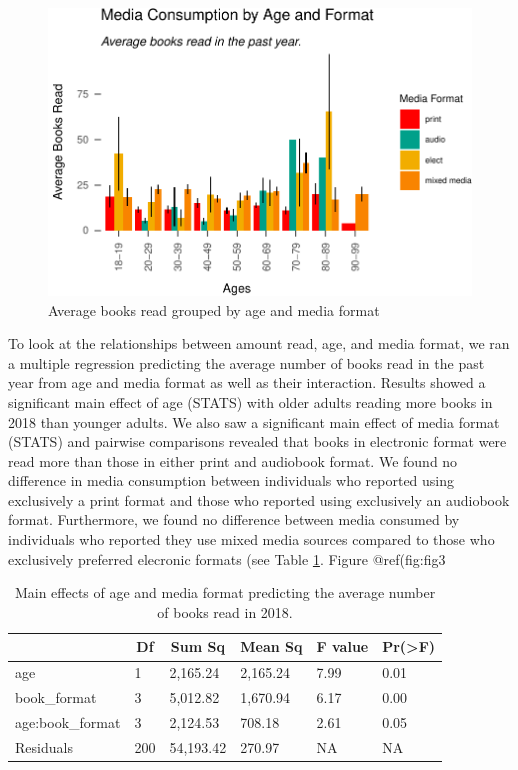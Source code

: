 \documentclass[man, fleqn, noextraspace]{apa6}
\theoremstyle{definition}
\theoremstyle{definition}
\theoremstyle{definition}
\theoremstyle{remark}
\begin{document}
\begin{figure}
\centering
\includegraphics{final_manuscript_files/figure-latex/fig3-1.pdf}
\caption{\label{fig:fig3}Average books read grouped by age and media format}
\end{figure}

To look at the relationships between amount read, age, and media format,
we ran a multiple regression predicting the average number of books read
in the past year from age and media format as well as their interaction.
Results showed a significant main effect of age (STATS) with older
adults reading more books in 2018 than younger adults. We also saw a
significant main effect of media format (STATS) and pairwise comparisons
revealed that books in electronic format were read more than those in
either print and audiobook format. We found no difference in media
consumption between individuals who reported using exclusively a print
format and those who reported using exclusively an audiobook format.
Furthermore, we found no difference between media consumed by
individuals who reported they use mixed media sources compared to those
who exclusively preferred elecronic formats (see Table \ref{tab:reg}.
Figure @ref(fig:fig3

\begin{table}[tbp]
\begin{center}
\begin{threeparttable}
\caption{\label{tab:reg}Main effects of age and media format predicting the average number of books read in 2018.}
\begin{tabular}{llllll}
\toprule
 & \multicolumn{1}{c}{Df} & \multicolumn{1}{c}{Sum Sq} & \multicolumn{1}{c}{Mean Sq} & \multicolumn{1}{c}{F value} & \multicolumn{1}{c}{Pr(>F)}\\
\midrule
age & 1 & 2,165.24 & 2,165.24 & 7.99 & 0.01\\
book\_format & 3 & 5,012.82 & 1,670.94 & 6.17 & 0.00\\
age:book\_format & 3 & 2,124.53 & 708.18 & 2.61 & 0.05\\
Residuals & 200 & 54,193.42 & 270.97 & NA & NA\\
\bottomrule
\end{tabular}
\end{threeparttable}
\end{center}
\end{table}
\end{document}
